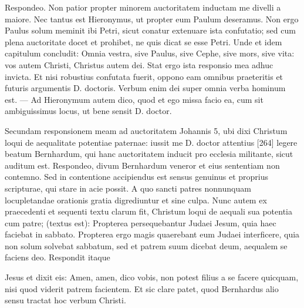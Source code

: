 Respondeo. Non patior propter minorem auctoritatem inductam me divelli a maiore. Nec tantus est Hieronymus, ut propter eum Paulum deseramus. Non ergo Paulus solum meminit ibi Petri, sicut conatur extenuare ista confutatio; sed cum plena auctoritate docet et prohibet, ne quis dicat se esse Petri. Unde et idem capitulum concludit: Omnia vestra, sive Paulus, sive Cephe, sive mors, sive vita: vos autem Christi, Christus autem dei. Stat ergo ista responsio mea adhuc invicta. Et nisi robustius confutata fuerit, oppono eam omnibus praeteritis et futuris argumentis D. doctoris. Verbum enim dei super omnia verba hominum est. — Ad Hieronymum autem dico, quod et ego missa facio ea, cum sit ambiguissimus locus, ut bene sensit D. doctor.

Secundam responsionem meam ad auctoritatem Johannis 5, ubi dixi Christum loqui de aequalitate potentiae paternae: iussit me D. doctor attentius [264] legere beatum Bernhardum, qui hanc auctoritatem inducit pro ecclesia militante, sicut auditum est. Respondeo, divum Bernhardum veneror et eius sententiam non contemno. Sed in contentione accipiendus est sensus genuinus et proprius scripturae, qui stare in acie possit. A quo sancti patres nonnunquam locupletandae orationis gratia digrediuntur et sine culpa. Nunc autem ex praecedenti et sequenti textu clarum fit, Christum loqui de aequali sua potentia cum patre; (textus est): Propterea persequebantur Judaei Jesum, quia haec faciebat in sabbato. Propterea ergo magis quaerebant eum Judaei interficere, quia non solum solvebat sabbatum, sed et patrem suum dicebat deum, aequalem se faciens deo. Respondit itaque

Jesus et dixit eis: Amen, amen, dico vobis, non potest filius a se facere quicquam, nisi quod viderit patrem facientem. Et sic clare patet, quod Bernhardus alio sensu tractat hoc verbum Christi.

